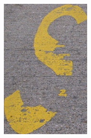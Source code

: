 \documentclass[a4paper]{article}
\begin{document}
\begin{enumerate}
\begin{enumerate}
\begin{figure}[H]
\begin{subfigure}[b]{.05\linewidth}
	        \end{subfigure}
	        \hfill
	        \begin{subfigure}[b]{.17\linewidth}
	            \includegraphics[width=\linewidth]{HW1-release/data/character_classification/new_images/3_S.jpg}
	        \end{subfigure}
            \hfill
	        \begin{subfigure}[b]{.1\linewidth}

\end{subfigure}
\end{figure}
\end{enumerate}
\end{enumerate}
\end{document}
